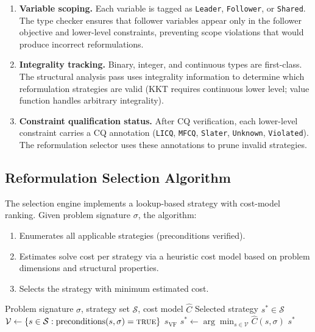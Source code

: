 \documentclass[11pt]{article}
\begin{document}
\begin{enumerate}
\item \textbf{Variable scoping.} Each variable is tagged as \texttt{Leader},
  \texttt{Follower}, or \texttt{Shared}. The type checker ensures that
  follower variables appear only in the follower objective and lower-level
  constraints, preventing scope violations that would produce incorrect
  reformulations.

\item \textbf{Integrality tracking.} Binary, integer, and continuous types
  are first-class. The structural analysis pass uses integrality information
  to determine which reformulation strategies are valid (KKT requires
  continuous lower level; value function handles arbitrary integrality).

\item \textbf{Constraint qualification status.} After CQ verification,
  each lower-level constraint carries a CQ annotation (\texttt{LICQ},
  \texttt{MFCQ}, \texttt{Slater}, \texttt{Unknown}, \texttt{Violated}).
  The reformulation selector uses these annotations to prune invalid
  strategies.
\end{enumerate}

\subsection{Reformulation Selection Algorithm}

The selection engine implements a lookup-based strategy with cost-model
ranking. Given problem signature $\sigma$, the algorithm:
\begin{enumerate}
\item Enumerates all applicable strategies (preconditions verified).
\item Estimates solve cost per strategy via a heuristic cost model based on
  problem dimensions and structural properties.
\item Selects the strategy with minimum estimated cost.
\end{enumerate}

\begin{algorithm}[t]
\caption{Reformulation Selection}
\label{alg:selection}
\begin{algorithmic}[1]
\REQUIRE Problem signature $\sigma$, strategy set $\mathcal{S}$, cost model $\hat{C}$
\ENSURE Selected strategy $s^* \in \mathcal{S}$
\STATE $\mathcal{V} \leftarrow \{s \in \mathcal{S} : \text{preconditions}(s, \sigma) = \textsc{true}\}$
  \RETURN $s_{\text{VF}}$ 
\ENDIF
\STATE $s^* \leftarrow \arg\min_{s \in \mathcal{V}} \hat{C}(s, \sigma)$
\RETURN $s^*$
\end{algorithmic}
\end{algorithm}
\end{document}
